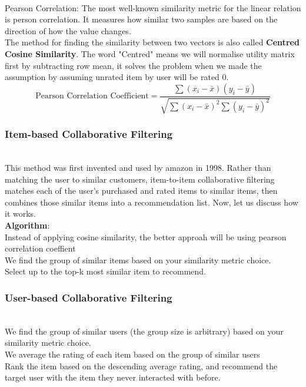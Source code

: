 \\Pearson Correlation: The most well-known similarity metric for the linear relation is person correlation. It measures how similar two samples are based on the direction of how the value changes.
\\The method for finding the similarity between two vectors is also called \textbf{Centred Cosine Similarity}. The word "Centred" means we will normalise utility matrix first by subtracting row mean, it solves the problem when we made the assumption by assuming unrated item by user will be rated 0. 
\begin{equation*}
\text{Pearson Correlation Coefficient} = \frac{\sum(x_{i} - \bar{x})(y_{i} - \bar{y})} {\sqrt{\sum(x_{i} - \bar{x})^{2} \sum{(y_{i} - \bar{y})^{2} }}}
\end{equation*}


\subsubsection{Item-based Collaborative Filtering}
\\This method was first invented and used by amazon in 1998. 
Rather than matching the user to similar customers, item-to-item collaborative filtering matches each of the user’s purchased and rated items to similar items, then combines those similar items into a recommendation list. Now, let us discuss how it works.
\\ \textbf{Algorithm}:
\\Instead of applying cosine similarity, the better approah will be using pearson correlation coeffient
\\We find the group of similar items based on your similarity metric choice.
\\Select up to the top-k most similar item to recommend.


\subsubsection{User-based Collaborative Filtering}
\\We find the group of similar users (the group size is arbitrary) based on your similarity metric choice.
\\We average the rating of each item based on the group of similar users
\\Rank the item based on the descending average rating, and recommend the target user with the item they never interacted with before.






